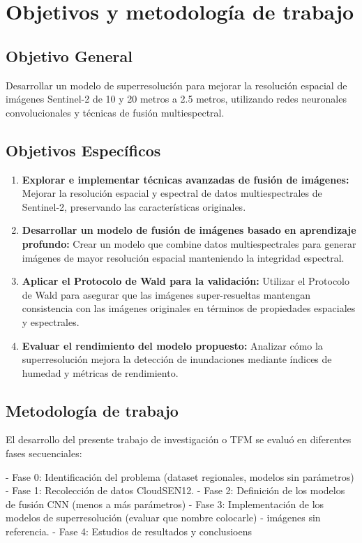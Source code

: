 \chapter{Objetivos y metodología de trabajo}

\section{Objetivo General}

    Desarrollar un modelo de superresolución para mejorar la resolución espacial de imágenes Sentinel-2 de 10 y 20 metros a 2.5 metros, utilizando redes neuronales convolucionales y técnicas de fusión multiespectral.


\section{Objetivos Específicos}

\begin{enumerate}
    \item \textbf{Explorar e implementar técnicas avanzadas de fusión de imágenes:} Mejorar la resolución espacial y espectral de datos multiespectrales de Sentinel-2, preservando las características originales.
    \item \textbf{Desarrollar un modelo de fusión de imágenes basado en aprendizaje profundo:} Crear un modelo que combine datos multiespectrales para generar imágenes de mayor resolución espacial manteniendo la integridad espectral.
    \item \textbf{Aplicar el Protocolo de Wald para la validación:} Utilizar el Protocolo de Wald para asegurar que las imágenes super-resueltas mantengan consistencia con las imágenes originales en términos de propiedades espaciales y espectrales.
    \item \textbf{Evaluar el rendimiento del modelo propuesto:} Analizar cómo la superresolución mejora la detección de inundaciones mediante índices de humedad y métricas de rendimiento.
\end{enumerate}

\section{Metodología de trabajo}

    El desarrollo del presente trabajo de investigación o TFM se evaluó en diferentes fases secuenciales:

    - Fase 0: Identificación  del problema (dataset regionales, modelos sin parámetros)
    - Fase 1: Recolección de datos CloudSEN12.
    - Fase 2: Definición de los modelos de fusión CNN (menos a más parámetros)
    - Fase 3: Implementación de los modelos de superresolución (evaluar que nombre colocarle) - imágenes sin referencia.
    - Fase 4: Estudios de resultados y conclusioens



